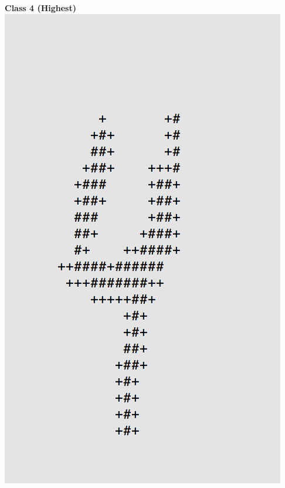 \documentclass[11pt]{article}
\begin{document}
\begin{center}
\begin{multicols}{2}
\textbf{Class 4 (Highest)}\\
\includegraphics[scale=0.4]{part1/1/high_4.png}


\end{multicols}
\end{center}
\end{document}

